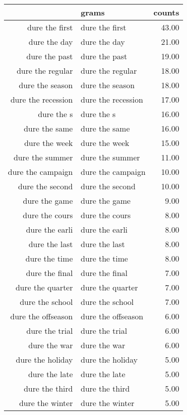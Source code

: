 \begin{table}[ht]
\centering
\begin{tabular}{rlr}
  \hline
 & grams & counts \\ 
  \hline
dure the first & dure the first & 43.00 \\ 
  dure the day & dure the day & 21.00 \\ 
  dure the past & dure the past & 19.00 \\ 
  dure the regular & dure the regular & 18.00 \\ 
  dure the season & dure the season & 18.00 \\ 
  dure the recession & dure the recession & 17.00 \\ 
  dure the s & dure the s & 16.00 \\ 
  dure the same & dure the same & 16.00 \\ 
  dure the week & dure the week & 15.00 \\ 
  dure the summer & dure the summer & 11.00 \\ 
  dure the campaign & dure the campaign & 10.00 \\ 
  dure the second & dure the second & 10.00 \\ 
  dure the game & dure the game & 9.00 \\ 
  dure the cours & dure the cours & 8.00 \\ 
  dure the earli & dure the earli & 8.00 \\ 
  dure the last & dure the last & 8.00 \\ 
  dure the time & dure the time & 8.00 \\ 
  dure the final & dure the final & 7.00 \\ 
  dure the quarter & dure the quarter & 7.00 \\ 
  dure the school & dure the school & 7.00 \\ 
  dure the offseason & dure the offseason & 6.00 \\ 
  dure the trial & dure the trial & 6.00 \\ 
  dure the war & dure the war & 6.00 \\ 
  dure the holiday & dure the holiday & 5.00 \\ 
  dure the late & dure the late & 5.00 \\ 
  dure the third & dure the third & 5.00 \\ 
  dure the winter & dure the winter & 5.00 \\ 

\end{tabular}
\end{table}
